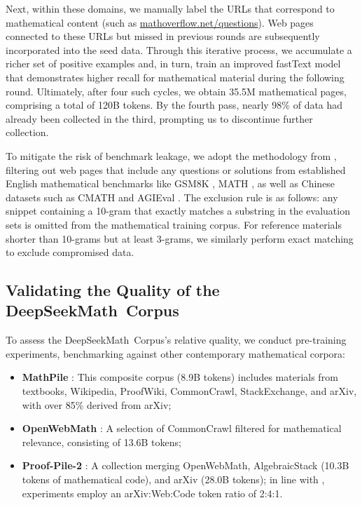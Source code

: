 Next, within these domains, we manually label the URLs that correspond to mathematical content (such as \url{mathoverflow.net/questions}). Web pages connected to these URLs but missed in previous rounds are subsequently incorporated into the seed data. Through this iterative process, we accumulate a richer set of positive examples and, in turn, train an improved fastText model that demonstrates higher recall for mathematical material during the following round. Ultimately, after four such cycles, we obtain 35.5M mathematical pages, comprising a total of 120B tokens. By the fourth pass, nearly 98\% of data had already been collected in the third, prompting us to discontinue further collection.

To mitigate the risk of benchmark leakage, we adopt the methodology from \cite{deepseek-coder}, filtering out web pages that include any questions or solutions from established English mathematical benchmarks like GSM8K \citep{gsm8k}, MATH \citep{MATH}, as well as Chinese datasets such as CMATH \citep{wei2023cmath} and AGIEval \citep{agieval}. The exclusion rule is as follows: any snippet containing a 10-gram that exactly matches a substring in the evaluation sets is omitted from the mathematical training corpus. For reference materials shorter than 10-grams but at least 3-grams, we similarly perform exact matching to exclude compromised data.

\subsection{Validating the Quality of the DeepSeekMath~Corpus}

To assess the DeepSeekMath~Corpus’s relative quality, we conduct pre-training experiments, benchmarking against other contemporary mathematical corpora:

\begin{itemize}[topsep=0pt]
    \item \textbf{MathPile} \citep{mathpile}: This composite corpus (8.9B tokens) includes materials from textbooks, Wikipedia, ProofWiki, CommonCrawl, StackExchange, and arXiv, with over 85\% derived from arXiv;
    \item \textbf{OpenWebMath} \citep{openwebmath}: A selection of CommonCrawl filtered for mathematical relevance, consisting of 13.6B tokens;
    \item \textbf{Proof-Pile-2} \citep{llemma}: A collection merging OpenWebMath, AlgebraicStack (10.3B tokens of mathematical code), and arXiv (28.0B tokens); in line with \cite{llemma}, experiments employ an arXiv:Web:Code token ratio of 2:4:1.
\end{itemize}

